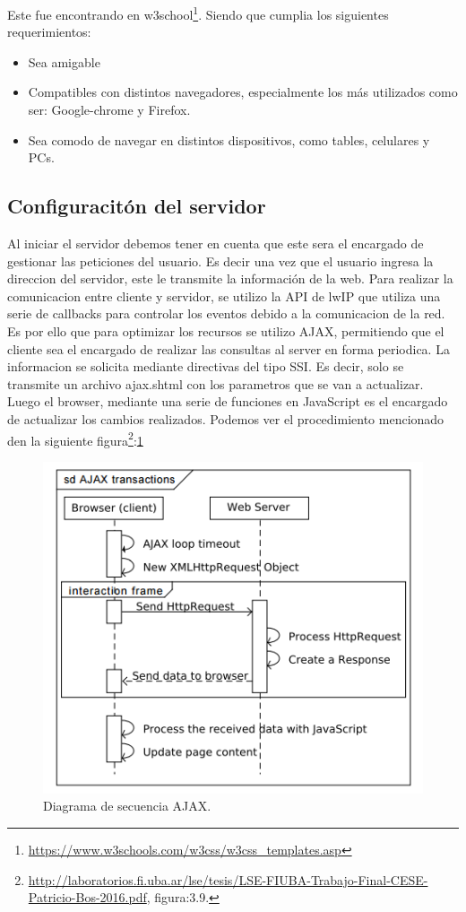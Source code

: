 Este fue encontrando en w3school\footnote{\url{https://www.w3schools.com/w3css/w3css_templates.asp}}. Siendo que cumplia los siguientes requerimientos:
\begin{itemize}
  \item Sea amigable
  \item Compatibles con distintos navegadores, especialmente los más utilizados como ser: Google-chrome y Firefox. 
  \item Sea comodo de navegar en distintos dispositivos, como tables, celulares y PCs.
\end{itemize}


\subsection*{Configuracitón del servidor}
Al iniciar el servidor debemos tener en cuenta que este sera el encargado de gestionar las peticiones del usuario. Es decir una vez que el usuario ingresa la direccion del servidor, este le transmite la información de la web.  Para realizar la comunicacion entre cliente y servidor, se utilizo la API de lwIP  que utiliza una serie de callbacks para controlar los eventos debido a la comunicacion de la red. Es por ello que para optimizar los recursos se utilizo AJAX, permitiendo que el cliente sea el encargado de realizar las consultas al server en forma periodica. La informacion se solicita mediante directivas del tipo SSI. Es decir, solo se transmite un archivo ajax.shtml con los parametros que se van a actualizar. Luego el browser, mediante una serie de funciones en JavaScript es el encargado de actualizar los cambios realizados.  
Podemos ver el procedimiento mencionado den la siguiente figura\footnote{\url{http://laboratorios.fi.uba.ar/lse/tesis/LSE-FIUBA-Trabajo-Final-CESE-Patricio-Bos-2016.pdf}, figura:3.9.}:\ref{fig:ajax_sec} 
\begin{figure}[!htb]
    \centering
    \includegraphics[scale=.8]{./Figures/ajax_sec.png}
    \caption{Diagrama de secuencia AJAX.}
    \label{fig:ajax_sec}
\end{figure}


